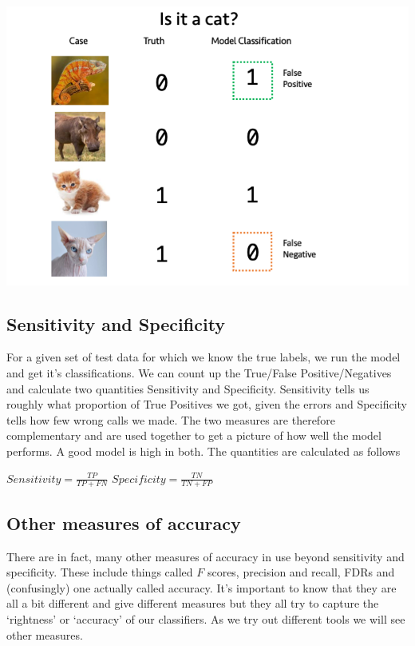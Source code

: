 \documentclass[
]{book}
\begin{document}
\includegraphics{figs/fpfn.png}

\hypertarget{sensitivity-and-specificity}{%
\subsection{Sensitivity and Specificity}\label{sensitivity-and-specificity}}

For a given set of test data for which we know the true labels, we run the model and get it's classifications. We can count up the True/False Positive/Negatives and calculate two quantities Sensitivity and Specificity. Sensitivity tells us roughly what proportion of True Positives we got, given the errors and Specificity tells how few wrong calls we made. The two measures are therefore complementary and are used together to get a picture of how well the model performs. A good model is high in both. The quantities are calculated as follows

\(Sensitivity = \frac{TP}{TP+FN}\)
\(Specificity = \frac{TN}{TN+FP}\)

\hypertarget{other-measures-of-accuracy}{%
\subsection{Other measures of accuracy}\label{other-measures-of-accuracy}}

There are in fact, many other measures of accuracy in use beyond sensitivity and specificity. These include things called \(F\) scores, precision and recall, FDRs and (confusingly) one actually called accuracy. It's important to know that they are all a bit different and give different measures but they all try to capture the `rightness' or `accuracy' of our classifiers. As we try out different tools we will see other measures.
\end{document}
